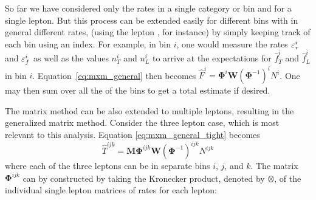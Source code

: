 So far we have considered only the rates
in a single category or bin and for a single lepton. 
But this process can be extended easily for different bins with in general different rates, 
(using the lepton \pt, for instance)
by simply keeping track of each bin using an index. For example,
in bin $i$, one would measure the rates $\varepsilon_r^i$ and $\varepsilon_f^i$
as well as the values $n_T^i$ and $n_L^i$ to arrive at the expectations
for $\hat{f}^i_T$ and $\hat{f}^i_L$ in bin $i$.
Equation~\eqref{eq:mxm_general} then becomes 
$\hat{F}^i = \mathbf{\Phi}^i\mathbf{W}(\mathbf{\Phi}^{-1})^i N^i$.
One may then sum over all the of the bins to get a total estimate
if desired.

The matrix method can be also extended to multiple leptons,
resulting in the generalized matrix method. 
Consider the three lepton case, which is most relevant to this
analysis. 
Equation \eqref{eq:mxm_general_tight} becomes
\begin{equation}
\hat{T}^{ijk} = \mathbf{M}\mathbf{\Phi}^{ijk}\mathbf{W}(\mathbf{\Phi}^{-1})^{ijk} N^{ijk}
\end{equation}
where each of the three leptons can be in separate bins $i$, $j$, and $k$.
The matrix $\mathbf{\Phi}^{ijk}$
can by constructed by taking the Kronecker product, denoted by $\otimes$,
of the individual single lepton matrices of rates for each lepton:

